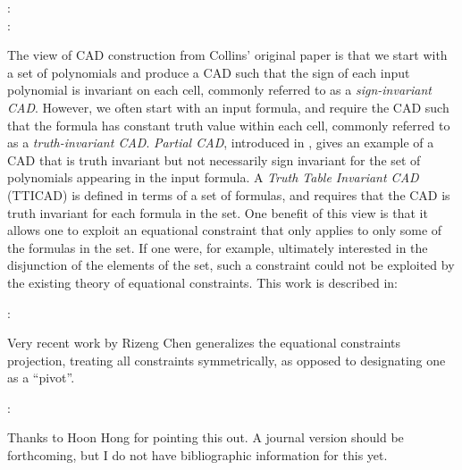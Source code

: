 \documentclass{article}
\begin{document}
%
\begin{description}
\item[\autocite{BrownMcCallum:05} :]  
\item[\autocite{BrownMcCallum:09} :]  
\end{description}
%

The view of CAD construction from Collins' original paper is that we
start with a set of polynomials and produce a CAD such that the sign
of each input polynomial is invariant on each cell, commonly referred
to as a \emph{sign-invariant CAD}. However, we often start with an
input formula, and require the CAD such that the formula has constant
truth value within each cell, commonly referred to as a
\emph{truth-invariant CAD}.  \emph{Partial CAD}, introduced in
, gives an example of a CAD that is truth invariant
but not necessarily sign invariant for the set of polynomials
appearing in the input formula.  A \emph{Truth Table Invariant CAD}
(TTICAD) is defined in terms of a set of formulas, and requires that
the CAD is truth invariant for each formula in the set.  One benefit
of this view is that it allows one to exploit an equational constraint
that only applies to only some of the formulas in the set.
If one were, for example, ultimately interested in the disjunction of
the elements of the set, such a constraint could not be exploited by
the existing theory of equational constraints.
This work is described in:
%
\begin{description}
\item[\autocite{BradfordEtAl:2016} :]  
\end{description}
%

Very recent work by Rizeng Chen generalizes the equational constraints
projection, treating all constraints symmetrically, as opposed to
designating one as a ``pivot''.
%
\begin{description}
\item[\autocite{chen:2025} :]  
\end{description}
%
Thanks to Hoon Hong for pointing this out.  A journal version should
be forthcoming, but I do not have bibliographic information for this yet.
\end{document}
